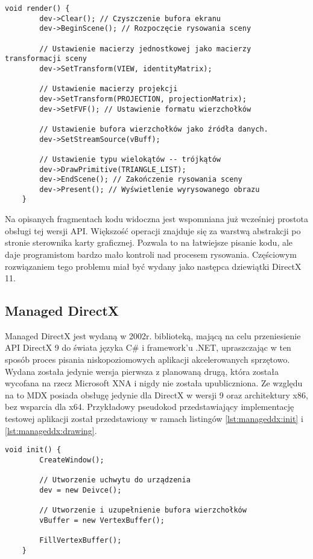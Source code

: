 \begin{lstlisting}[caption={Pseudokod rysowania Direct3D 9}, label={lst:d3d9:render}]
	void render() {
		dev->Clear(); // Czyszczenie bufora ekranu
		dev->BeginScene(); // Rozpoczęcie rysowania sceny
		
		// Ustawienie macierzy jednostkowej jako macierzy transformacji sceny		
		dev->SetTransform(VIEW, identityMatrix);
		
		// Ustawienie macierzy projekcji
		dev->SetTransform(PROJECTION, projectionMatrix);
		dev->SetFVF(); // Ustawienie formatu wierzchołków
		
		// Ustawienie bufora wierzchołków jako źródła danych.
		dev->SetStreamSource(vBuff);
		
		// Ustawienie typu wielokątów -- trójkątów		
		dev->DrawPrimitive(TRIANGLE_LIST);	
		dev->EndScene(); // Zakończenie rysowania sceny		
		dev->Present(); // Wyświetlenie wyrysowanego obrazu
	}
\end{lstlisting}

Na opisanych fragmentach kodu widoczna jest wspomniana już wcześniej
prostota obsługi tej wersji API. Większość operacji znajduje się za
warstwą abstrakcji po stronie sterownika karty graficznej. Pozwala to na
łatwiejsze pisanie kodu, ale daje programistom bardzo mało kontroli nad
procesem rysowania. Częściowym rozwiązaniem tego problemu miał być
wydany jako następca dziewiątki DirectX 11.

\subsection{Managed DirectX}

Managed DirectX jest wydaną w 2002r. biblioteką, mającą na celu
przeniesienie API DirectX 9 do świata języka C\# i framework'u .NET,
upraszczając w ten sposób proces pisania niskopoziomowych aplikacji
akcelerowanych sprzętowo. Wydana została jedynie wersja pierwsza z planowaną drugą, która została
wycofana na rzecz Microsoft XNA i nigdy nie została upubliczniona. Ze
względu na to MDX posiada obsługę jedynie dla DirectX w wersji 9 oraz
architektury x86, bez wsparcia dla x64. Przykładowy pseudokod przedstawiający implementację testowej aplikacji
został przedstawiony w ramach listingów \ref{lst:manageddx:init} i \ref{lst:manageddx:drawing}.

\begin{lstlisting}[caption={Funkcja inicjalizacji przy pomocy Managed DirectX}, label={lst:manageddx:init}]
	void init() {
		CreateWindow();
		
		// Utworzenie uchwytu do urządzenia
		dev = new Deivce();
		
		// Utworzenie i uzupełnienie bufora wierzchołków
		vBuffer = new VertexBuffer();
		
		FillVertexBuffer();
	}
\end{lstlisting}

